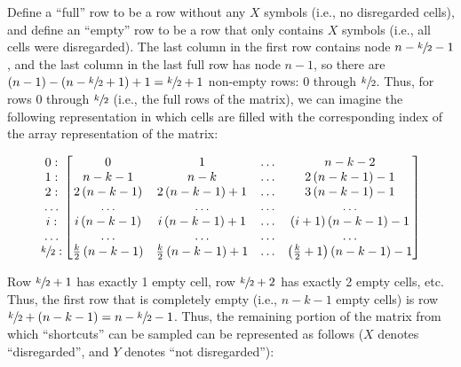 \documentclass[a4paper,num-refs,gigabyte]{oup-contemporary}
\begin{document}
Define a ``full'' row to be a row without any $X$ symbols (i.e., no disregarded cells), and define an ``empty'' row to be a row that only contains $X$ symbols (i.e., all cells were disregarded). The last column in the first row contains node $n-\sfrac{k}{2}-1$, and the last column in the last full row has node $n-1$, so there are $\left(n-1\right)-\left(n-\sfrac{k}{2}+1\right)+1=\sfrac{k}{2}+1$ non-empty rows: $0$ through $\sfrac{k}{2}$. Thus, for rows $0$ through $\sfrac{k}{2}$ (i.e., the full rows of the matrix), we can imagine the following representation in which cells are filled with the corresponding index of the array representation of the matrix:

\begin{equation}
\begin{matrix}
0:\\
1:\\
2:\\
\ldots\\
i:\\
\ldots\\
\sfrac{k}{2}:\\
\end{matrix}
\begin{bmatrix}
0 & 1 & \ldots & n-k-2\\
n-k-1 & n-k & \ldots & 2\left(n-k-1\right)-1\\
2\left(n-k-1\right) & 2\left(n-k-1\right)+1 & \ldots & 3\left(n-k-1\right)-1\\
\ldots & \ldots & \ldots & \ldots\\
i\left(n-k-1\right) & i\left(n-k-1\right)+1 & \ldots & \left(i+1\right)\left(n-k-1\right)-1\\
\ldots & \ldots & \ldots & \ldots\\
\frac{k}{2}\left(n-k-1\right) & \frac{k}{2}\left(n-k-1\right)+1 & \ldots & \left(\frac{k}{2}+1\right)\left(n-k-1\right)-1\\
\end{bmatrix}
\end{equation}

Row $\sfrac{k}{2}+1$ has exactly 1 empty cell, row $\sfrac{k}{2}+2$ has exactly 2 empty cells, etc. Thus, the first row that is completely empty (i.e., $n-k-1$ empty cells) is row $\sfrac{k}{2}+\left(n-k-1\right)=n-\sfrac{k}{2}-1$. Thus, the remaining portion of the matrix from which ``shortcuts'' can be sampled can be represented as follows ($X$ denotes ``disregarded'', and $Y$ denotes ``not disregarded''):
\end{document}
